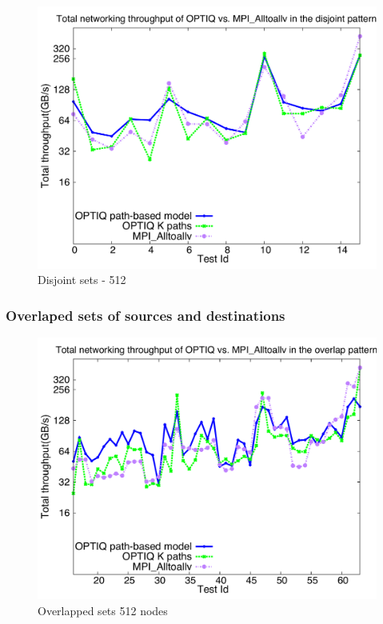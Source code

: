 \begin{figure}[!htb]
\vspace{-0.1in}
\centering
\includegraphics[scale=0.30]{figures/disjoint_512.pdf}
\vspace{-0.1in}
\caption{Disjoint sets - 512}
\vspace{-0.1in}
\label{fig:disjoint_512}
\end{figure}

\subsubsection{Overlaped sets of sources and destinations}

\begin{figure}[!htb]
\vspace{-0.1in}
\centering
\includegraphics[scale=0.30]{figures/overlap_512.pdf}
\vspace{-0.1in}
\caption{Overlapped sets 512 nodes}
\vspace{-0.1in}
\label{fig:overlap_512}
\end{figure}

